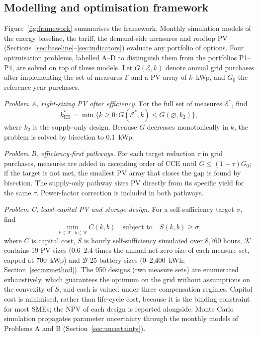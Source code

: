 \documentclass[processes,article,submit,pdftex,moreauthors]{Definitions/mdpi}
\begin{document}
\subsection{Modelling and optimisation framework}
\label{sec:framework}
Figure~\ref{fig:framework} summarises the framework. Monthly simulation models of the energy baseline, the tariff, the demand-side measures and rooftop PV (Sections~\ref{sec:baseline}--\ref{sec:indicators}) evaluate any portfolio of options. Four optimisation problems, labelled A--D to distinguish them from the portfolios P1--P4, are solved on top of these models. Let $G(\mathcal{E},k)$ denote annual grid purchases after implementing the set of measures $\mathcal{E}$ and a PV array of $k$~kWp, and $G_0$ the reference-year purchases.

\emph{Problem A, right-sizing PV after efficiency.} For the full set of measures $\mathcal{E}^{\ast}$, find
\begin{equation}
k_{\mathrm{EE}}^{\ast} = \min\{k \ge 0 : G(\mathcal{E}^{\ast},k) \le G(\varnothing,k_2)\},
\label{eq:pA}
\end{equation}
where $k_2$ is the supply-only design. Because $G$ decreases monotonically in $k$, the problem is solved by bisection to 0.1~kWp.

\emph{Problem B, efficiency-first pathways.} For each target reduction $\tau$ in grid purchases, measures are added in ascending order of CCE until $G \le (1-\tau)G_0$; if the target is not met, the smallest PV array that closes the gap is found by bisection. The supply-only pathway sizes PV directly from its specific yield for the same $\tau$. Power-factor correction is included in both pathways.

\emph{Problem C, least-capital PV and storage design.} For a self-sufficiency target $\sigma$, find
\begin{equation}
\min_{k\in\mathcal{K},\,b\in\mathcal{B}} C(k,b) \quad \text{subject to} \quad S(k,b) \ge \sigma,
\label{eq:pC}
\end{equation}
where $C$ is capital cost, $S$ is hourly self-sufficiency simulated over 8,760 hours, $\mathcal{K}$ contains 19 PV sizes (0.6--2.4 times the annual net-zero size of each measure set, capped at 700~kWp) and $\mathcal{B}$ 25 battery sizes (0--2,400~kWh; Section~\ref{sec:nzmethod}). The 950 designs (two measure sets) are enumerated exhaustively, which guarantees the optimum on the grid without assumptions on the convexity of $S$, and each is valued under three compensation regimes. Capital cost is minimised, rather than life-cycle cost, because it is the binding constraint for most SMEs; the NPV of each design is reported alongside. Monte Carlo simulation propagates parameter uncertainty through the monthly models of Problems A and B (Section~\ref{sec:uncertainty}).
\end{document}
